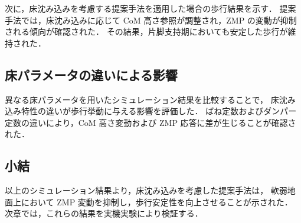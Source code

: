 次に，床沈み込みを考慮する提案手法を適用した場合の歩行結果を示す．
提案手法では，床沈み込みに応じて CoM 高さ参照が調整され，ZMP の変動が抑制される傾向が確認された．
その結果，片脚支持期においても安定した歩行が維持された．


\subsection{床パラメータの違いによる影響}
\label{subsec:sim_param_effect}

異なる床パラメータを用いたシミュレーション結果を比較することで，
床沈み込み特性の違いが歩行挙動に与える影響を評価した．
ばね定数およびダンパー定数の違いにより，CoM 高さ変動および ZMP 応答に差が生じることが確認された．

\subsection{小結}
\label{subsec:sim_summary}

以上のシミュレーション結果より，床沈み込みを考慮した提案手法は，
軟弱地面上において ZMP 変動を抑制し，歩行安定性を向上させることが示された．
次章では，これらの結果を実機実験により検証する．
